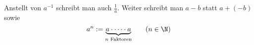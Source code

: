 Anstellt von $a^{-1}$ schreibt man auch $\frac{1}{a}$. Weiter schreibt man $a-b$ statt $a+(-b)$ sowie
$$a^n :=  \underbrace{a \cdot \dots \cdot a}_\text{$n$ Faktoren} \qquad (n \in \N)$$